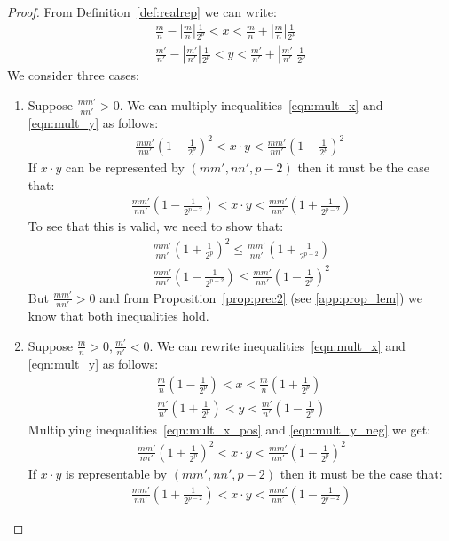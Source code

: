 \documentclass{article}
\numberwithin{mytheorem}{section}
\begin{document}
\begin{proof}
From Definition~\ref{def:realrep} we can write:
\begin{align}
\frac{m}{n}-|\frac{m}{n}|\frac{1}{2^{p}}<x<\frac{m}{n}+|\frac{m}{n}|\frac{1}{2^{p}} \label{eqn:mult_x}\\
\frac{m'}{n'}-|\frac{m'}{n'}|\frac{1}{2^{p}}<y<\frac{m'}{n'}+|\frac{m'}{n'}|\frac{1}{2^{p}} \label{eqn:mult_y}
\end{align}
We consider three cases:
\begin{enumerate}
\item
Suppose $\frac{mm'}{nn'}>0$. We can multiply inequalities~\eqref{eqn:mult_x} and \eqref{eqn:mult_y} as follows:
\begin{align*}
\frac{mm'}{nn'}(1-\frac{1}{2^{p}})^2<x\cdot y <\frac{mm'}{nn'}(1+\frac{1}{2^{p}})^2\
\end{align*}
If $x\cdot y$ can be represented by $(mm',nn',p-2)$ then it must be the case that:
\begin{align*}
\frac{mm'}{nn'}(1-\frac{1}{2^{p-2}})<x\cdot y<\frac{mm'}{nn'}(1+\frac{1}{2^{p-2}})
\end{align*}
To see that this is valid, we need to show that:
\begin{align*}
\frac{mm'}{nn'}(1+\frac{1}{2^{p}})^2\leq \frac{mm'}{nn'}(1+\frac{1}{2^{p-2}})\\
\frac{mm'}{nn'}(1-\frac{1}{2^{p-2}}) \leq \frac{mm'}{nn'}(1-\frac{1}{2^{p}})^2
\end{align*}
But $\frac{mm'}{nn'}>0$ and from Proposition~\ref{prop:prec2} (see \ref{app:prop_lem}) we know that both inequalities hold.
\item
Suppose $\frac{m}{n}>0, \frac{m'}{n'}<0$. We can rewrite inequalities~\eqref{eqn:mult_x} and \eqref{eqn:mult_y} as follows:
\begin{align}
\frac{m}{n}(1-\frac{1}{2^{p}})<x<\frac{m}{n}(1+\frac{1}{2^{p}})\label{eqn:mult_x_pos} \\
\frac{m'}{n'}(1+\frac{1}{2^{p}})<y<\frac{m'}{n'}(1-\frac{1}{2^{p}}) \label{eqn:mult_y_neg}
\end{align}
Multiplying inequalities~\eqref{eqn:mult_x_pos} and \eqref{eqn:mult_y_neg} we get:
\begin{align*}
\frac{mm'}{nn'}(1+\frac{1}{2^{p}})^2<x\cdot y<\frac{mm'}{nn'}(1-\frac{1}{2^{p}})^2
\end{align*}
If $x\cdot y$ is representable by $(mm',nn',p-2)$ then it must be the case that:
\begin{align*}
\frac{mm'}{nn'}(1+\frac{1}{2^{p-2}})<x\cdot y<\frac{mm'}{nn'}(1-\frac{1}{2^{p-2}})

\end{align*}
\end{enumerate}
\end{proof}
\end{document}
